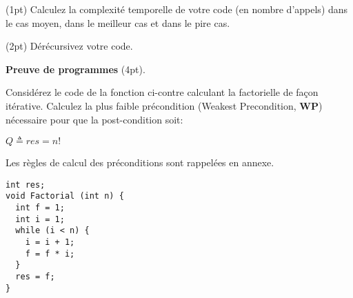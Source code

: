 \documentclass[10pt]{article}\usepackage[correction,nu]{esial}
\begin{document}
\Question(1pt) Calculez la complexité temporelle de votre code (en nombre
d'appels) dans le cas moyen, dans le meilleur cas et dans le pire cas.

\Question(2pt) Dérécursivez votre code.




\bigskip\Exercice\textbf{Preuve de programmes} (4pt).

\noindent\begin{minipage}{.73\linewidth}
  Considérez le code de la fonction ci-contre calculant la factorielle de façon
  itérative. Calculez la plus faible précondition (Weakest Precondition,
  \textbf{WP}) nécessaire pour que la post-condition soit:

  \begin{center}
    $Q \triangleq res = n!$
  \end{center}

  Les règles de calcul des préconditions sont rappelées en annexe.
\end{minipage}\hfill\begin{minipage}{.24\linewidth}
\begin{Verbatim}[numbers=right]
int res;
void Factorial (int n) {
  int f = 1;
  int i = 1;
  while (i < n) {
    i = i + 1;
    f = f * i;
  }
  res = f;
}
\end{Verbatim}  
\end{minipage}
\end{document}
